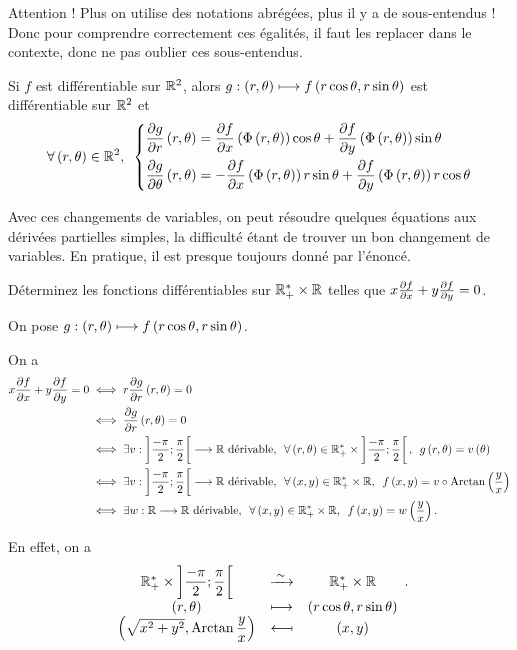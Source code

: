 \begin{rem}
Attention ! Plus on utilise des notations abrégées, plus il y a de sous-entendus ! Donc pour comprendre correctement ces égalités, il faut les replacer dans le contexte, donc ne pas oublier ces sous-entendus.
\end{rem}

\begin{ex}
Si \(f\) est différentiable sur \(\mathbb{R}^2\), alors \(g:\left(r,\theta\right)\longmapsto f\left(r\cos\theta,r\sin\theta\right)\) est différentiable sur \(\mathbb{R}^2\) et \[\quantifs{\forall\paren{r,\theta}\in\R^2}\begin{dcases}
\pdv{g}{r}\paren{r,\theta}=\pdv{f}{x}\paren{\Phi\paren{r,\theta}}\cos\theta+\pdv{f}{y}\paren{\Phi\paren{r,\theta}}\sin\theta \\
\pdv{g}{\theta}\paren{r,\theta}=-\pdv{f}{x}\paren{\Phi\paren{r,\theta}}r\sin\theta+\pdv{f}{y}\paren{\Phi\paren{r,\theta}}r\cos\theta
\end{dcases}\]

Avec ces changements de variables, on peut résoudre quelques équations aux dérivées partielles simples, la difficulté étant de trouver un bon changement de variables. En pratique, il est presque toujours donné par l'énoncé.
\end{ex}

\begin{exo}
Déterminez les fonctions différentiables sur \(\mathbb{R}_+^*\times\mathbb{R}\) telles que \(x\pdv{f}{x}+y\pdv{f}{y}=0\).
\end{exo}

\begin{corr}
On pose \(g:\left(r,\theta\right)\longmapsto f\left(r\cos\theta,r\sin\theta\right)\).

On a \[\begin{aligned}
x\pdv{f}{x}+y\pdv{f}{y}=0&\ssi r\pdv{g}{r}\paren{r,\theta}=0 \\
&\ssi\pdv{g}{r}\paren{r,\theta}=0 \\
&\ssi\quantifs{\exists v:\intervee{\dfrac{-\pi}{2}}{\dfrac{\pi}{2}}\to\R\text{ dérivable};\forall\paren{r,\theta}\in\Rps\times\intervee{\dfrac{-\pi}{2}}{\dfrac{\pi}{2}}}g\paren{r,\theta}=v\paren{\theta} \\
&\ssi\quantifs{\exists v:\intervee{\dfrac{-\pi}{2}}{\dfrac{\pi}{2}}\to\R\text{ dérivable};\forall\paren{x,y}\in\Rps\times\R}f\paren{x,y}=v\rond\Arctan\paren{\dfrac{y}{x}} \\
&\ssi\quantifs{\exists w:\R\to\R\text{ dérivable};\forall\paren{x,y}\in\Rps\times\R}f\paren{x,y}=w\paren{\dfrac{y}{x}}.
\end{aligned}\]

En effet, on a \[\isomorphismelambdaavecreciproque{\Rps\times\intervee{\dfrac{-\pi}{2}}{\dfrac{\pi}{2}}}{\Rps\times\R}{\paren{r,\theta}}{\paren{r\cos\theta,r\sin\theta}}{\paren{\sqrt{x^2+y^2},\Arctan\dfrac{y}{x}}}{\paren{x,y}}.\]
\end{corr}

